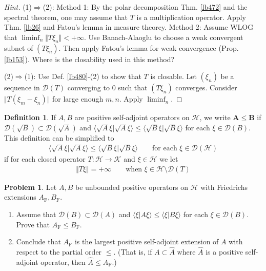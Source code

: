 \documentclass[12pt,b5paper,notitlepage]{article}
\theoremstyle{definition}
\newtheorem{df}{Definition}[subsection]
\newtheorem{prob}{\color{red}Problem}[section]
\theoremstyle{plain}
\newcommand{\wht}{\widehat}
\newcommand{\Dom}{\mathscr{D}}
\newcommand{\bk}[1]{\langle {#1}\rangle}
\newcommand{\MH}{\mathcal H}
\newcommand{\MK}{\mathcal K}
\newcommand{\Frm}{{\mathrm F}}
\numberwithin{equation}{section}
\begin{document}
\begin{proof}[Hint]
(1)$\Rightarrow$(2): Method 1: By the polar decomposition Thm. \ref{lb472} and the spectral theorem, one may assume that $T$ is a multiplication operator. Apply Thm. \ref{lb26} and Fatou's lemma in measure theorey. Method 2: Assume WLOG that $\liminf_n\Vert T\xi_n\Vert<+\infty$. Use Banach-Alaoglu to choose a weak convergent subnet of $(T\xi_n)$. Then apply Fatou's lemma for weak convergence (Prop. \ref{lb153}). Where is the closability used in this method?

(2)$\Rightarrow$(1): Use Def. \ref{lb480}-(2) to show that $T$ is closable. Let $(\xi_n)$ be a sequence in $\Dom(T)$ converging to $0$ such that $(T\xi_n)$ converges. Consider $\Vert T(\xi_m-\xi_n)\Vert$ for large enough $m,n$. Apply $\liminf_n$.
\end{proof}

\begin{df}
If $A,B$ are positive self-adjoint operators on $\MH$, we write $\pmb{A\leq B}$  if $\Dom(\sqrt B)\subset\Dom(\sqrt A)$ and $\bk{\sqrt A\xi|\sqrt A\xi}\leq\bk{\sqrt B\xi|\sqrt B\xi}$ for each $\xi\in\Dom(B)$. This definition can be simplified to
\begin{align*}
\bk{\sqrt A\xi|\sqrt A\xi}\leq\bk{\sqrt B\xi|\sqrt B\xi}\qquad\text{for each }\xi\in\Dom(\MH)
\end{align*}
if for each closed operator $T:\MH\rightarrow\MK$ and $\xi\in\MH$ we let
\begin{align*}
\Vert T\xi\Vert=+\infty\qquad\text{when }\xi\in\MH\setminus\Dom(T)
\end{align*}
\end{df}


\begin{prob}
Let $A,B$ be unbounded positive operators on $\MH$ with Friedrichs extensions $A_\Frm,B_\Frm$. 
\begin{enumerate}
\item Assume that $\Dom(B)\subset\Dom(A)$ and $\bk{\xi|A\xi}\leq\bk{\xi|B\xi}$ for each $\xi\in \Dom(B)$. Prove that $A_\Frm\leq B_\Frm$.
\item Conclude that $A_\Frm$ is the largest positive self-adjoint extension of $A$ with respect to the partial order $\leq$. (That is, if $A\subset\wht A$ where $\wht A$ is a positive self-adjoint operator, then $\wht A\leq A_\Frm$.)
\end{enumerate}
\end{prob}
\end{document}
